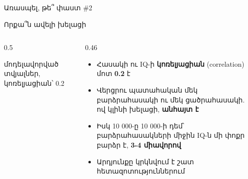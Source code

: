 
\begin{frame}{Առասպել, թե՞ փաստ \#2}
\end{frame}

\begin{frame}{Որքա՞ն ավելի խելացի}
  \begin{columns}[c]
    \begin{column}{0.5\textwidth}
      \centering
      \par
      {\scriptsize\color{plum!70!cream} մոդելավորված տվյալներ, կոռելյացիան՝ 0.2\par}
    \end{column}
    \begin{column}{0.46\textwidth}
      \begin{itemize}
        \item Հասակի ու IQ-ի \textbf{կոռելյացիան} (correlation) մոտ \textbf{0.2} է
        \item<2-> Վերցրու պատահական մեկ բարձրահասակի ու մեկ ցածրահասակի. ով կլինի խելացի, \textbf{անհայտ է}
        \item<3-> Իսկ 10 000-ը 10 000-ի դեմ՝ բարձրահասակների միջին IQ-ն մի փոքր բարձր է, \textbf{3-4 միավորով}
        \item<4-> Արդյունքը կրկնվում է շատ հետազոտություններում
      \end{itemize}
    \end{column}
  \end{columns}
\end{frame}

